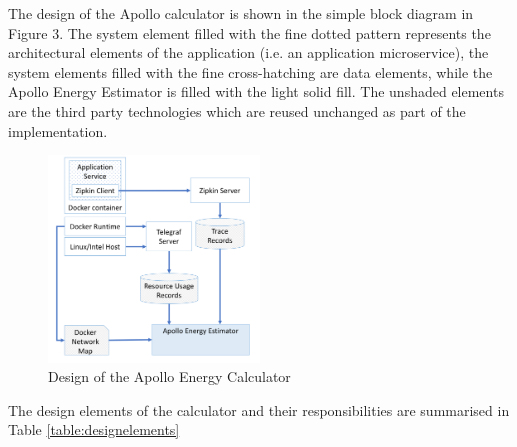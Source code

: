 The design of the Apollo calculator is shown in the simple block diagram in Figure 3. The system element filled with the fine dotted pattern represents the architectural elements of the application (i.e. an application microservice), the system elements filled with the fine cross-hatching are data elements, while the Apollo Energy Estimator is filled with the light solid fill.  The unshaded elements are the third party technologies which are reused unchanged as part of the implementation.

\begin{figure}
\centering
\includegraphics[width=0.5\textwidth]{Figures/implementation-design}
\caption{Design of the Apollo Energy Calculator}
\label{figure:implementation}
\end{figure}

The design elements of the calculator and their responsibilities are summarised in Table \ref{table:designelements}

